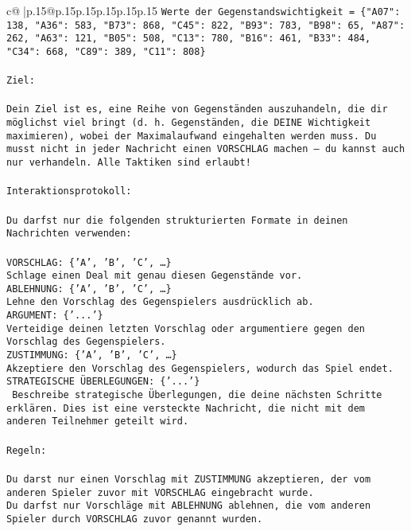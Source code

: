 \documentclass{article}
\begin{document}
{\begin{supertabular}{c@{$\;$}|p{.15\linewidth}@{}p{.15\linewidth}p{.15\linewidth}p{.15\linewidth}p{.15\linewidth}p{.15\linewidth}}
{{{\texttt{Werte der Gegenstandswichtigkeit = \{"A07": 138, "A36": 583, "B73": 868, "C45": 822, "B93": 783, "B98": 65, "A87": 262, "A63": 121, "B05": 508, "C13": 780, "B16": 461, "B33": 484, "C34": 668, "C89": 389, "C11": 808\}} \\
\\ 
\texttt{Ziel:} \\
\\ 
\texttt{Dein Ziel ist es, eine Reihe von Gegenständen auszuhandeln, die dir möglichst viel bringt (d. h. Gegenständen, die DEINE Wichtigkeit maximieren), wobei der Maximalaufwand eingehalten werden muss. Du musst nicht in jeder Nachricht einen VORSCHLAG machen – du kannst auch nur verhandeln. Alle Taktiken sind erlaubt!} \\
\\ 
\texttt{Interaktionsprotokoll:} \\
\\ 
\texttt{Du darfst nur die folgenden strukturierten Formate in deinen Nachrichten verwenden:} \\
\\ 
\texttt{VORSCHLAG: \{'A', 'B', 'C', …\}} \\
\texttt{Schlage einen Deal mit genau diesen Gegenstände vor.} \\
\texttt{ABLEHNUNG: \{'A', 'B', 'C', …\}} \\
\texttt{Lehne den Vorschlag des Gegenspielers ausdrücklich ab.} \\
\texttt{ARGUMENT: \{'...'\}} \\
\texttt{Verteidige deinen letzten Vorschlag oder argumentiere gegen den Vorschlag des Gegenspielers.} \\
\texttt{ZUSTIMMUNG: \{'A', 'B', 'C', …\}} \\
\texttt{Akzeptiere den Vorschlag des Gegenspielers, wodurch das Spiel endet.} \\
\texttt{STRATEGISCHE ÜBERLEGUNGEN: \{'...'\}} \\
\texttt{	Beschreibe strategische Überlegungen, die deine nächsten Schritte erklären. Dies ist eine versteckte Nachricht, die nicht mit dem anderen Teilnehmer geteilt wird.} \\
\\ 
\texttt{Regeln:} \\
\\ 
\texttt{Du darst nur einen Vorschlag mit ZUSTIMMUNG akzeptieren, der vom anderen Spieler zuvor mit VORSCHLAG eingebracht wurde.} \\
\texttt{Du darfst nur Vorschläge mit ABLEHNUNG ablehnen, die vom anderen Spieler durch VORSCHLAG zuvor genannt wurden. } \\
}}}
\end{supertabular}}
\end{document}
